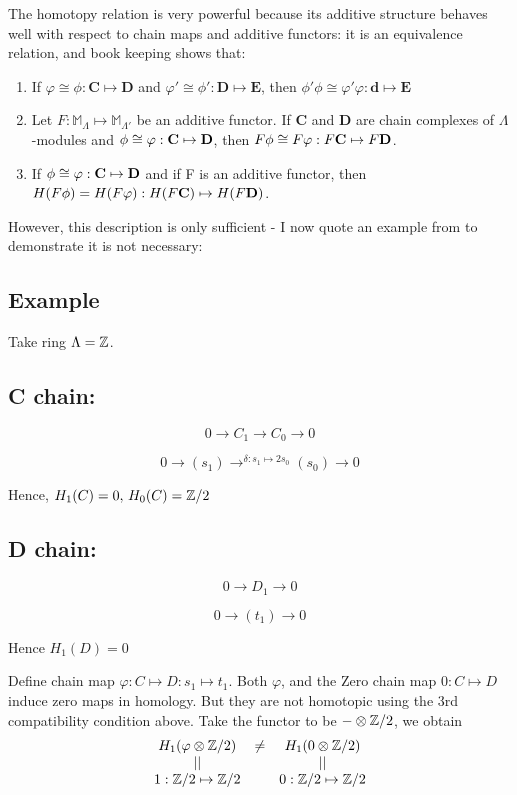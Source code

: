 The homotopy relation is very powerful because its additive
structure behaves well with respect to chain maps and additive
functors: it is an equivalence relation, and book keeping shows
that:
\begin{enumerate}
    \item If $\varphi \cong \phi:\textbf{C}\mapsto\textbf{D}$ and
    $\varphi' \cong \phi':\textbf{D}\mapsto\textbf{E}$, then
    $\phi'\phi\cong\varphi'\varphi: \mathbf{d}\mapsto \mathbf{E}$
    \item Let $F: \mathbb M_\Lambda \mapsto \mathbb M_{\Lambda'}$
    be an additive functor. If $\textbf{C}$ and $\textbf{D}$ are
    chain complexes of $\Lambda$-modules and $\phi\cong \varphi
    :\textbf{C} \mapsto \textbf D$, then $F\phi \cong
    F\varphi:F\textbf C \mapsto F\textbf D$.
    \item If $\phi \cong \varphi: \textbf C \mapsto \textbf D$ and
    if F is an additive functor, then $H(F\phi) = H(F\varphi):
    H(F\textbf C) \mapsto H(F \textbf D)$.
\end{enumerate}
However, this description is only sufficient - I now quote an
example from \cite{HS} to demonstrate it is not necessary:



\subsection{Example}\label{df1.2.4}
Take ring $\Lambda = \mathbb Z$.
\subsection*{C chain:}

$$0\rightarrow C_1\rightarrow C_0\rightarrow 0$$

$$0\rightarrow (s_1) \rightarrow^{\delta:s_1\mapsto 2s_0} (s_0)
\rightarrow 0$$

Hence, $H_1(C) = 0,\, H_0(C) = \mathbb Z/2$

\subsection*{D chain:}

$$0\rightarrow D_1 \rightarrow 0$$

$$0\rightarrow (t_1) \rightarrow 0$$

Hence $H_1(D) = 0$

Define chain map $\varphi:C\mapsto D:s_1\mapsto t_1$. Both
$\varphi$, and the Zero chain map $0:C\mapsto D$ induce zero maps
in homology. But they are not homotopic using the 3rd
compatibility condition above. Take the functor to be $-\otimes
\mathbb Z/2$, we obtain
$$\begin{array}{ccc}
  H_1(\varphi\otimes \mathbb Z/2) & \neq & H_1(0\otimes \mathbb Z/2) \\
  || &  & || \\
  1:\mathbb Z/2 \mapsto \mathbb Z/2 &  & 0:\mathbb Z/2 \mapsto \mathbb Z/2 \\
\end{array}$$






